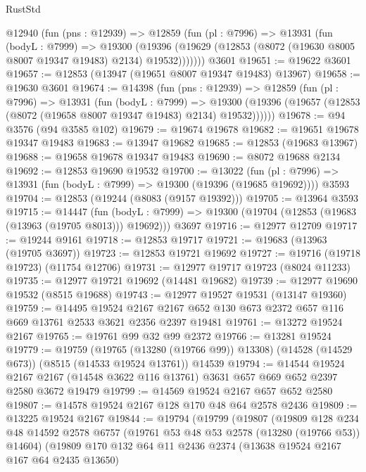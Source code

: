\begin{lexlean}{RustStd}
\begin{coremodule}
    @12940
      (fun (pns : @12939) =>
      @12859
        (fun (pl : @7996) =>
        @13931
          (fun (bodyL : @7999) =>
          @19300
            (@19396 (@19629 (@12853 (@8072 (@19630 @8005 @8007 @19347 @19483) @2134) @19532)))))))
    @3601
@19651 := @19622 @3601
@19657 := @12853 (@13947 (@19651 @8007 @19347 @19483) @13967)
@19658 := @19630 @3601
@19674 := @14398
    (fun (pns : @12939) =>
    @12859
      (fun (pl : @7996) =>
      @13931
        (fun (bodyL : @7999) =>
        @19300 (@19396 (@19657 (@12853 (@8072 (@19658 @8007 @19347 @19483) @2134) @19532))))))
@19678 := @94 @3576 (@94 @3585 @102)
@19679 := @19674 @19678
@19682 := @19651 @19678 @19347 @19483
@19683 := @13947 @19682
@19685 := @12853 (@19683 @13967)
@19688 := @19658 @19678 @19347 @19483
@19690 := @8072 @19688 @2134
@19692 := @12853 @19690 @19532
@19700 := @13022
    (fun (pl : @7996) => @13931 (fun (bodyL : @7999) => @19300 (@19396 (@19685 @19692))))
    @3593
@19704 := @12853 (@19244 (@8083 (@9157 @19392)))
@19705 := @13964 @3593
@19715 := @14447
    (fun (bodyL : @7999) => @19300 (@19704 (@12853 (@19683 (@13963 (@19705 @8013))) @19692)))
    @3697
@19716 := @12977 @12709
@19717 := @19244 @9161
@19718 := @12853 @19717
@19721 := @19683 (@13963 (@19705 @3697))
@19723 := @12853 @19721 @19692
@19727 := @19716 (@19718 @19723) (@11754 @12706)
@19731 := @12977 @19717 @19723 (@8024 @11233)
@19735 := @12977 @19721 @19692 (@14481 @19682)
@19739 := @12977 @19690 @19532 (@8515 @19688)
@19743 := @12977 @19527 @19531 (@13147 @19360)
@19759 := @14495
    @19524
    @2167
    @2167
    @652
    @130
    @673
    @2372
    @657
    @116
    @669
    @13761
    @2533
    @3621
    @2356
    @2397
    @19481
@19761 := @13272 @19524 @2167
@19765 := @19761 @99 @32 @99 @2372
@19766 := @13281 @19524
@19779 := @19759
    (@19765 (@13280 (@19766 @99)) @13308)
    (@14528 (@14529 @673))
    (@8515 (@14533 @19524 @13761))
    @14539
@19794 := @14544
    @19524
    @2167
    @2167
    (@14548 @3622 @116 @13761)
    @3631
    @657
    @669
    @652
    @2397
    @2580
    @3672
    @19479
@19799 := @14569 @19524 @2167 @657 @652 @2580
@19807 := @14578 @19524 @2167 @128 @170 @48 @64 @2578 @2436
@19809 := @13225 @19524 @2167
@19844 := @19794
    (@19799
      (@19807
        (@19809
          @128
          @234
          @48
          @14592
          @2578
          @6757
          (@19761 @53 @48 @53 @2578 (@13280 (@19766 @53)) @14604)
          (@19809
            @170
            @132
            @64
            @11
            @2436
            @2374
            (@13638 @19524 @2167 @167 @64 @2435 @13650)

\end{coremodule}
\end{lexlean}

